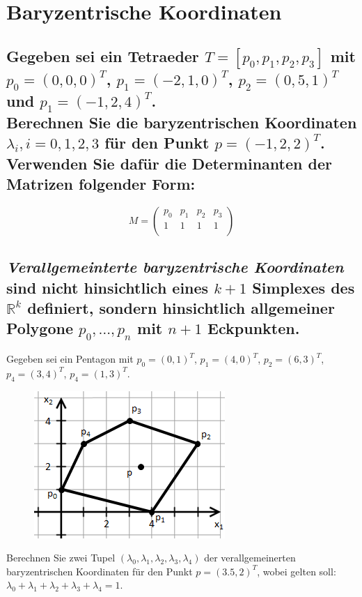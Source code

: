 \documentclass[a4paper,10pt,DIV=14]{scrartcl}
\begin{document}
\section{Baryzentrische Koordinaten}

\subsection{Gegeben sei ein Tetraeder $T = [p_0, p_1, p_2, p_3]$ mit $p_0 = (0, 0, 0)^T$, $p_1 = (-2, 1, 0)^T$, $p_2 = (0, 5, 1)^T$ und $p_1 = (-1, 2, 4)^T$. \vspace{.5em} \\  Berechnen Sie die baryzentrischen Koordinaten $\lambda_i, i = 0, 1, 2, 3$ für den Punkt $p = (-1, 2, 2)^T$. Verwenden Sie dafür die Determinanten der Matrizen folgender Form:}
	$$M = \begin{pmatrix}
	p_0 & p_1 & p_2 & p_3 \\
	1   & 1   & 1   & 1   \\
	\end{pmatrix}$$


\subsection{\emph{Verallgemeinterte baryzentrische Koordinaten} sind nicht hinsichtlich eines $k+1$ Simplexes des $\mathbb{R}^k$ definiert, sondern hinsichtlich allgemeiner Polygone $p_0, \dots, p_n$ mit $n+1$ Eckpunkten.}

Gegeben sei ein Pentagon mit $p_0 = (0, 1)^T$, $p_1 = (4, 0)^T$, $p_2 = (6, 3)^T$, $p_4 = (3, 4)^T$, $p_4 = (1, 3)^T$.
\begin{figure}[!htbp]
	\centering
	\includegraphics[]{simplex}
\end{figure}

Berechnen Sie zwei Tupel $(\lambda_0, \lambda_1, \lambda_2, \lambda_3, \lambda_4)$ der verallgemeinerten baryzentrischen Koordinaten für den Punkt $p = (3.5, 2)^T$, wobei gelten soll: $\lambda_0 + \lambda_1 + \lambda_2 + \lambda_3 + \lambda_4 = 1$.
\end{document}
